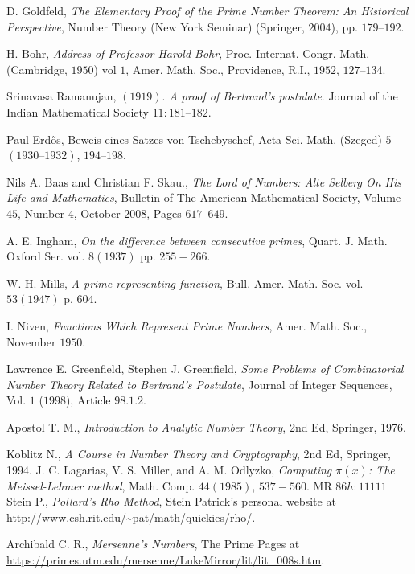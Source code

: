 \documentclass{subfiles}
\begin{document}
\begin{thebibliography}{99}
	 D. Goldfeld, \textit{The Elementary Proof of the Prime Number Theorem: An Historical Perspective}, Number Theory (New York Seminar) (Springer, $2004$), pp. $179–192$.
	
	 H. Bohr, \textit{Address of Professor Harold Bohr}, Proc. Internat. Congr. Math. (Cambridge, $1950$) vol $1$, Amer. Math. Soc., Providence, R.I., $1952$, $127–134$.
	
	 Srinavasa Ramanujan, $(1919)$. \textit{A proof of Bertrand's postulate}. Journal of the Indian Mathematical Society $11: 181–182$.
	
	 Paul Erd\H{o}s, Beweis eines Satzes von Tschebyschef, Acta Sci. Math. (Szeged) $5$ $(1930–1932)$, $194–198$.
	
	 Nils A. Baas and Christian F. Skau., \textit{The Lord of Numbers: Alte Selberg On His Life and Mathematics}, Bulletin of The American Mathematical Society, Volume $45$, Number $4$, October $2008$, Pages $617–649$.
	
	 A. E. Ingham, \textit{On the difference between consecutive primes}, Quart. J. Math. Oxford Ser. vol. $8 (1937)$ pp. $255-266$.
	
	 W. H. Mills, \textit{A prime-representing function}, Bull. Amer. Math. Soc. vol. $53 (1947)$ p. $604$.
	
	 I. Niven, \textit{Functions Which Represent Prime Numbers}, Amer. Math. Soc., November $1950$.
	
	 Lawrence E. Greenfield, Stephen J. Greenfield, \textit{Some Problems of Combinatorial Number Theory Related to Bertrand's Postulate}, Journal of Integer Sequences, Vol. $1$ ($1998$), Article $98.1.2$.
	
	 Apostol T. M., \textit{Introduction to Analytic Number Theory}, 2nd Ed, Springer, 1976.
	
	 Koblitz N., \textit{A Course in Number Theory and Cryptography}, 2nd Ed, Springer, 1994.
	 J. C. Lagarias, V. S. Miller, and A. M. Odlyzko, \textit{Computing $\pi(x)$: The Meissel-Lehmer method}, Math. Comp. $44 (1985)$, $537-560$. MR $86h:11111$
	 Stein P., \textit{Pollard's Rho Method}, Stein Patrick's personal website at \url{http://www.csh.rit.edu/~pat/math/quickies/rho/}.
	
	 Archibald C. R., \textit{Mersenne's Numbers}, The Prime Pages at \url{https://primes.utm.edu/mersenne/LukeMirror/lit/lit_008s.htm}.
	

\end{thebibliography}
\end{document}
